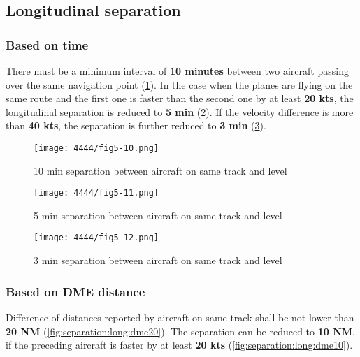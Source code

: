 \subsection{Longitudinal separation}

\subsubsection{Based on time}

There must be a minimum interval of \textbf{10 minutes} between two aircraft
passing over the same navigation point (\cref{fig:separation:long:10min}). In
the case when the planes are flying on the same route and the first one is
faster than the second one by at least \textbf{20 kts}, the longitudinal
separation is reduced to \textbf{5 min} (\cref{fig:separation:long:5min}). If
the velocity difference is more than \textbf{40 kts}, the separation is further
reduced to \textbf{3 min} (\cref{fig:separation:long:3min}).

\begin{figure}[htbp] \centering
\texttt{[image: 4444/fig5-10.png]}
  \caption{10 min separation between aircraft on same track and
level~\cite{4444}}
  \label{fig:separation:long:10min}
\end{figure}

\begin{figure}[htbp] \centering
\texttt{[image: 4444/fig5-11.png]}
  \caption{5 min separation between aircraft on same track and
level~\cite{4444}}
  \label{fig:separation:long:5min}
\end{figure}

\begin{figure}[htbp] \centering
\texttt{[image: 4444/fig5-12.png]}
  \caption{3 min separation between aircraft on same track and
level~\cite{4444}}
  \label{fig:separation:long:3min}
\end{figure}

\subsubsection{Based on DME distance}

Difference of distances reported by aircraft on same track shall be not lower
than \textbf{20 NM} (\cref{fig:separation:long:dme20}). The separation can be
reduced to \textbf{10 NM}, if the preceding aircraft is faster by at least
\textbf{20 kts} (\cref{fig:separation:long:dme10}).

